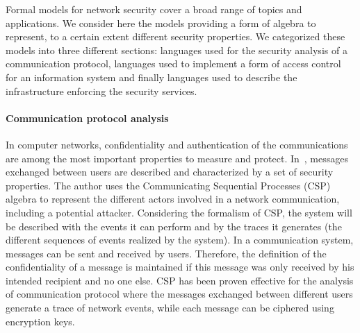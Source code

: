 Formal models for network security cover a broad range of topics and applications.
We consider here the models providing a form of algebra to represent, to a certain extent different security properties. We categorized these models into three different sections: languages used for the security analysis of a communication protocol, languages used to implement a form of access control for an information system and finally languages used to describe the infrastructure enforcing the security services.

\paragraph{Communication protocol analysis}
In computer networks, confidentiality and authentication of the communications are among the most important properties to measure and protect.
In~\cite{CSP-Schneider1996}, messages exchanged between users are described and characterized by a set of security properties.
The author uses the Communicating Sequential Processes (CSP) algebra to represent the different actors involved in a network communication, including a potential attacker. 
Considering the formalism of CSP, the system will be described with the events it can perform and by the traces it generates (\ie the different sequences of events realized by the system).
In a communication system, messages can be sent and received by users.
Therefore, the definition of the confidentiality of a message is maintained if this message was only received by his intended recipient and no one else.
CSP has been proven effective for the analysis of communication protocol where the messages exchanged between different users generate a trace of network events, while each message can be ciphered using encryption keys.

